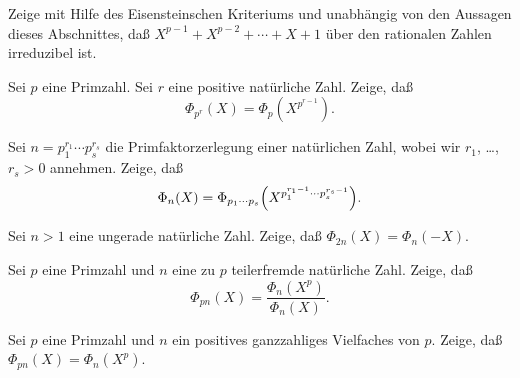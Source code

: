 \documentclass{algsheet}
\begin{document}
\begin{exercise}
    Zeige mit Hilfe des Eisensteinschen Kriteriums und unabhängig von den Aussagen dieses Abschnittes,
    daß \(X^{p - 1} + X^{p - 2} + \dotsb + X + 1\) über den rationalen Zahlen irreduzibel ist.
\end{exercise}



\begin{exercise}
    Sei \(p\) eine Primzahl. Sei \(r\) eine positive natürliche Zahl. Zeige, daß
    \begin{equation}
        \Phi_{p^r}(X) = \Phi_p(X^{p^{r - 1}}).
    \end{equation}
\end{exercise}

\begin{exercise}
    Sei \(n = p_1^{r_1} \dotsm p_s^{r_s}\) die Primfaktorzerlegung einer natürlichen Zahl, wobei wir
    \(r_1\), \dots, \(r_s > 0\) annehmen. Zeige, daß
    \begin{equation}
        \Phi_n(X) = \Phi_{p_1 \dotsm p_s}\Bigl(X^{p_1^{r_1 - 1} \dotsm p_s^{r_s - 1}}\Bigr).
    \end{equation}
\end{exercise}

\begin{exercise}
    Sei \(n > 1\) eine ungerade natürliche Zahl. Zeige, daß \(\Phi_{2n}(X) = \Phi_n(-X)\).
\end{exercise}

\begin{exercise}
    Sei \(p\) eine Primzahl und \(n\) eine zu \(p\) teilerfremde natürliche Zahl. Zeige, daß
    \begin{equation}
        \Phi_{pn}(X) = \frac{\Phi_n(X^p)}{\Phi_n(X)}.
    \end{equation}
\end{exercise}

\begin{exercise}
    Sei \(p\) eine Primzahl und \(n\) ein positives ganzzahliges Vielfaches von \(p\). Zeige, daß
    \(\Phi_{pn}(X) = \Phi_n(X^p)\).
\end{exercise}
\end{document}
